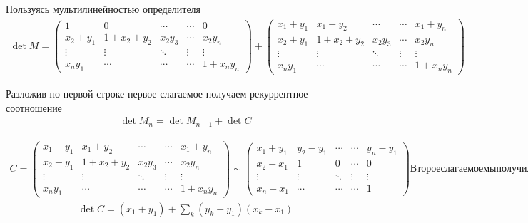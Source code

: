 \begin{sol}
    Пользуясь мультилинейностью определителя
    \begin{gather*}
       \det M =  \left(
        \begin{array}{ccccc}
            1  &  0 & \cdots & \cdots & 0 \\
           x_{2}  + y_{1}  &   1 + x_{2} + y_{2} & x_{2} y_{3} & \cdots & x_{2} y_{n}\\
           \vdots & \vdots & \ddots& \vdots & \vdots\\
           x_{n} y_{1} & \cdots & \cdots & \cdots & 1 + x_{n} y_{n}
        \end{array}
        \right) +
        \left(
        \begin{array}{ccccc}
            x_{1}  + y_{1} &  x_{1} +  y_{2} & \cdots & \cdots &x_{1} + y_{n}\\
           x_{2}  + y_{1}  &   1 + x_{2} + y_{2} & x_{2} y_{3} & \cdots & x_{2} y_{n}\\
           \vdots & \vdots & \ddots& \vdots & \vdots\\
           x_{n} y_{1} & \cdots & \cdots & \cdots & 1 + x_{n} y_{n}
        \end{array}
        \right)
    \end{gather*}
    
    Разложив по первой строке первое слагаемое получаем рекуррентное соотношение
    \begin{gather*}
        \det  M_{n} = \det  M_{n-1} + \det C
    \end{gather*}
    
    
    \begin{gather*}
        C =  \left(
        \begin{array}{ccccc}
            x_{1}  + y_{1} &  x_{1} +  y_{2} & \cdots & \cdots &x_{1} + y_{n}\\
           x_{2}  + y_{1}  &   1 + x_{2} + y_{2} & x_{2} y_{3} & \cdots & x_{2} y_{n}\\
           \vdots & \vdots & \ddots& \vdots & \vdots\\
           x_{n} y_{1} & \cdots & \cdots & \cdots & 1 + x_{n} y_{n}
        \end{array}
        \right) \sim
         \left(
        \begin{array}{ccccc}
            x_{1}  + y_{1} &  y_{2} - y_{1} & \cdots & \cdots & y_{n} - y_{1}\\
           x_{2}  - x_{1}  &   1 & 0 & \cdots & 0\\
           \vdots & \vdots & \ddots& \vdots & \vdots\\
           x_{n} - x_{1} & \cdots & \cdots & \cdots & 1 
        \end{array}
        \right)
        Второе слагаемое мы получили вычтя первую строку из каждой строки,
        а потом первую колонку и всех остальных.
    \end{gather*}
    \begin{gather*}
        \det C = (x_{1} + y_{1}) + \sum_{k}(y_{k} - y_{1})(x_{k} - x_{1})
    \end{gather*}
    

\end{sol}
